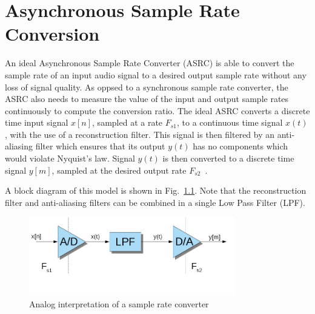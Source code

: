
\chapter{Asynchronous Sample Rate Conversion}
\label{chapter:asrc}

An ideal Asynchronous Sample Rate Converter (ASRC) is able to convert the sample
rate of an input audio signal to a desired output sample rate without
any loss of signal quality. As oppsed to a synchronous sample rate converter,
the ASRC also needs to measure the value of the input and output sample rates
continuously to compute the conversion ratio. The ideal ASRC
converts a discrete time input signal $x[n]$, sampled at a rate $F_{s1}$, to a
continuous time signal $x(t)$, with the use of a reconstruction filter. This
signal is then filtered by an anti-aliasing filter which ensures that its output
$y(t)$ has no components which would violate Nyquist's law. Signal $y(t)$ is then
converted to a discrete time signal $y[m]$, sampled at the desired output rate
$F_{s2}$~\cite{crochiere:multirate}.

A block diagram of this model is shown in Fig.~\ref{fig:classic_analog}. Note
that the reconstruction filter and anti-aliasing filters can be combined in a
single Low Pass Filter (LPF).

\begin{figure}[!htb]
  \centering
  \includegraphics[width=0.8\textwidth]{Figures/classic_analog_alg.png}
  \caption{Analog interpretation of a sample rate converter}
  \label{fig:classic_analog}
\end{figure}

